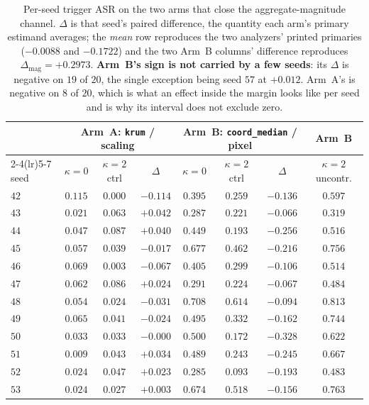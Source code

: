 \documentclass{article}
\begin{document}
\begin{table}[h]
\caption{Per-seed trigger ASR on the two arms that close the aggregate-magnitude channel. $\Delta$ is
that seed's paired difference, the quantity each arm's primary estimand averages; the \emph{mean} row
reproduces the two analyzers' printed primaries ($-0.0088$ and $-0.1722$) and the two Arm~B columns'
difference reproduces $\Delta_{\mathrm{mag}}{=}{+}0.2973$. \textbf{Arm~B's sign is not carried by a few
seeds}: its $\Delta$ is negative on $19$ of $20$, the single exception being seed $57$ at $+0.012$.
Arm~A's is negative on $8$ of $20$, which is what an effect inside the margin looks like per seed and
is why its interval does not exclude zero.}
\label{tab:magnitude_perseed}
\centering\scriptsize
\begin{tabular}{lccccccc}
\toprule
 & \multicolumn{3}{c}{Arm~A: \texttt{krum} / scaling} & \multicolumn{3}{c}{Arm~B: \texttt{coord\_median} / pixel} & Arm~B \\
\cmidrule(lr){2-4}\cmidrule(lr){5-7}
seed & $\kappa{=}0$ & $\kappa{=}2$ ctrl & $\Delta$ & $\kappa{=}0$ & $\kappa{=}2$ ctrl & $\Delta$ & $\kappa{=}2$ uncontr. \\
\midrule
$42$ & $0.115$ & $0.000$ & $-0.114$ & $0.395$ & $0.259$ & $-0.136$ & $0.597$ \\
$43$ & $0.021$ & $0.063$ & $+0.042$ & $0.287$ & $0.221$ & $-0.066$ & $0.319$ \\
$44$ & $0.047$ & $0.087$ & $+0.040$ & $0.449$ & $0.193$ & $-0.256$ & $0.516$ \\
$45$ & $0.057$ & $0.039$ & $-0.017$ & $0.677$ & $0.462$ & $-0.216$ & $0.756$ \\
$46$ & $0.069$ & $0.003$ & $-0.067$ & $0.405$ & $0.299$ & $-0.106$ & $0.514$ \\
$47$ & $0.062$ & $0.086$ & $+0.024$ & $0.291$ & $0.224$ & $-0.067$ & $0.484$ \\
$48$ & $0.054$ & $0.024$ & $-0.031$ & $0.708$ & $0.614$ & $-0.094$ & $0.813$ \\
$49$ & $0.065$ & $0.041$ & $-0.024$ & $0.495$ & $0.332$ & $-0.162$ & $0.744$ \\
$50$ & $0.033$ & $0.033$ & $-0.000$ & $0.500$ & $0.172$ & $-0.328$ & $0.622$ \\
$51$ & $0.009$ & $0.043$ & $+0.034$ & $0.489$ & $0.243$ & $-0.245$ & $0.667$ \\
$52$ & $0.024$ & $0.047$ & $+0.023$ & $0.285$ & $0.093$ & $-0.193$ & $0.483$ \\
$53$ & $0.024$ & $0.027$ & $+0.003$ & $0.674$ & $0.518$ & $-0.156$ & $0.763$ \\

\end{tabular}
\end{table}
\end{document}
